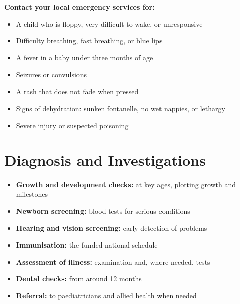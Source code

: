 \textbf{Contact your local emergency services for:}
\begin{itemize}
    \item A child who is floppy, very difficult to wake, or unresponsive
    \item Difficulty breathing, fast breathing, or blue lips
    \item A fever in a baby under three months of age
    \item Seizures or convulsions
    \item A rash that does not fade when pressed
    \item Signs of dehydration: sunken fontanelle, no wet nappies, or lethargy
    \item Severe injury or suspected poisoning
\end{itemize}

\section*{Diagnosis and Investigations}
\begin{itemize}
    \item \textbf{Growth and development checks:} at key ages, plotting growth and milestones
    \item \textbf{Newborn screening:} blood tests for serious conditions
    \item \textbf{Hearing and vision screening:} early detection of problems
    \item \textbf{Immunisation:} the funded national schedule
    \item \textbf{Assessment of illness:} examination and, where needed, tests
    \item \textbf{Dental checks:} from around 12 months
    \item \textbf{Referral:} to paediatricians and allied health when needed
\end{itemize}

